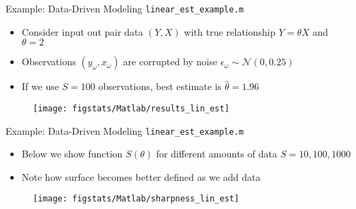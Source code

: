 \documentclass[9pt]{beamer}
\begin{document}
%
\begin{frame}{Example: Data-Driven Modeling \footnotesize{\texttt{linear\_est\_example.m}}}

\begin{block}{}
\begin{itemize}
\setlength{\itemsep}{10pt}
\item Consider input out pair data $(Y,X)$ with true relationship $Y=\theta X$ and $\theta=2$
\item Observations $(y_\omega,x_\omega)$ are corrupted by noise $\epsilon_\omega  \sim \mathcal{N}(0,0.25)$
\item If we use $S=100$ observations, best estimate is $\hat{\theta}=1.96$ 
\end{itemize}
\end{block}

\begin{figure}[!htb]
    \centering
	\texttt{[image: figstats/Matlab/results\_lin\_est]}
\end{figure}

\end{frame}

%
\begin{frame}{Example: Data-Driven Modeling \footnotesize{\texttt{linear\_est\_example.m}}}

\begin{block}{}
\begin{itemize}
\setlength{\itemsep}{5pt}
\item Below we show function $S(\theta)$ for different amounts of data $S=10,100,1000$
\item Note how surface becomes better defined as we add data
\end{itemize}
\end{block}

\begin{figure}[!htb]
    \centering
	\texttt{[image: figstats/Matlab/sharpness\_lin\_est]}
\end{figure}

\end{frame}
\end{document}
